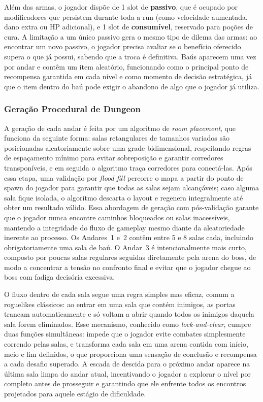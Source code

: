 \documentclass[12pt, a4paper]{article}
\begin{document}
Al\'em das armas, o jogador disp\~oe de 1 slot de \textbf{passivo}, que \'e ocupado por modificadores que persistem durante toda a run (como velocidade aumentada, dano extra ou HP adicional), e 1 slot de \textbf{consum\'ivel}, reservado para po\c{c}\~oes de cura. A limita\c{c}\~ao a um \'unico passivo gera o mesmo tipo de dilema das armas: ao encontrar um novo passivo, o jogador precisa avaliar se o benef\'icio oferecido supera o que j\'a possui, sabendo que a troca \'e definitiva. Ba\'us aparecem uma vez por andar e cont\^em um item aleat\'orio, funcionando como o principal ponto de recompensa garantida em cada n\'ivel e como momento de decis\~ao estrat\'egica, j\'a que o item dentro do ba\'u pode exigir o abandono de algo que o jogador j\'a utiliza.

\subsubsection{Gera\c{c}\~ao Procedural de Dungeon}

A gera\c{c}\~ao de cada andar \'e feita por um algoritmo de \textit{room placement}, que funciona da seguinte forma: salas retangulares de tamanhos variados s\~ao posicionadas aleatoriamente sobre uma grade bidimensional, respeitando regras de espa\c{c}amento m\'inimo para evitar sobreposi\c{c}\~ao e garantir corredores transpon\'iveis, e em seguida o algoritmo tra\c{c}a corredores para conect\'a-las. Ap\'os essa etapa, uma valida\c{c}\~ao por \textit{flood fill} percorre o mapa a partir do ponto de spawn do jogador para garantir que todas as salas sejam alcan\c{c}\'aveis; caso alguma sala fique isolada, o algoritmo descarta o layout e regenera integralmente at\'e obter um resultado v\'alido. Essa abordagem de gera\c{c}\~ao com p\'os-valida\c{c}\~ao garante que o jogador nunca encontre caminhos bloqueados ou salas inacess\'iveis, mantendo a integridade do fluxo de gameplay mesmo diante da aleatoriedade inerente ao processo. Os Andares~1 e~2 cont\^em entre 5 e 8 salas cada, incluindo obrigatoriamente uma sala de ba\'u. O Andar~3 \'e intencionalmente mais curto, composto por poucas salas regulares seguidas diretamente pela arena do boss, de modo a concentrar a tens\~ao no confronto final e evitar que o jogador chegue ao boss com fadiga decis\'oria excessiva.

O fluxo dentro de cada sala segue uma regra simples mas eficaz, comum a roguelikes cl\'assicos: ao entrar em uma sala que cont\'em inimigos, as portas trancam automaticamente e s\'o voltam a abrir quando todos os inimigos daquela sala forem eliminados. Esse mecanismo, conhecido como \textit{lock-and-clear}, cumpre duas fun\c{c}\~oes simult\^aneas: impede que o jogador evite combates simplesmente correndo pelas salas, e transforma cada sala em uma arena contida com in\'icio, meio e fim definidos, o que proporciona uma sensa\c{c}\~ao de conclus\~ao e recompensa a cada desafio superado. A escada de descida para o pr\'oximo andar aparece na \'ultima sala limpa do andar atual, incentivando o jogador a explorar o n\'ivel por completo antes de prosseguir e garantindo que ele enfrente todos os encontros projetados para aquele est\'agio de dificuldade.
\end{document}
